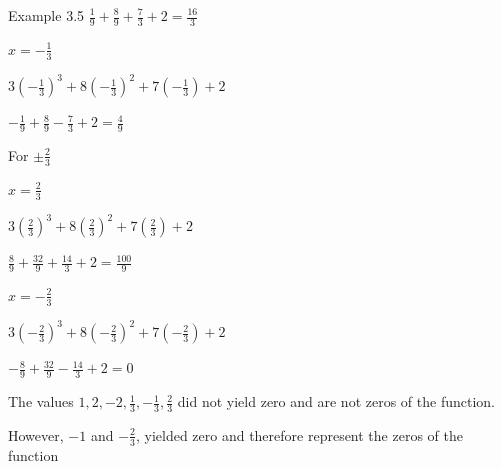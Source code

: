 \begin{example}{Example 3.5}
$\frac{1}{9} + \frac{8}{9} + \frac{7}{3} + 2 = \frac{16}{3}$

$x = -\frac{1}{3}$

$3\left(-\frac{1}{3}\right)^3 + 8\left(-\frac{1}{3}\right)^2 + 7\left(-\frac{1}{3}\right) + 2$

$-\frac{1}{9} + \frac{8}{9} - \frac{7}{3} + 2 = \frac{4}{9}$

For $\pm\frac{2}{3}$

$x = \frac{2}{3}$

$3\left(\frac{2}{3}\right)^3 + 8\left(\frac{2}{3}\right)^2 + 7\left(\frac{2}{3}\right) + 2$

$\frac{8}{9} + \frac{32}{9} + \frac{14}{3} + 2 = \frac{100}{9}$

$x = -\frac{2}{3}$

$3\left(-\frac{2}{3}\right)^3 + 8\left(-\frac{2}{3}\right)^2 + 7\left(-\frac{2}{3}\right) + 2$

$-\frac{8}{9} + \frac{32}{9} - \frac{14}{3} + 2 = 0$

The values $1, 2, -2, \frac{1}{3}, -\frac{1}{3}, \frac{2}{3}$ did not yield zero and are
not zeros of the function.

However, $-1$ and $-\frac{2}{3}$, yielded zero and therefore represent the zeros of
the function
\end{example}
